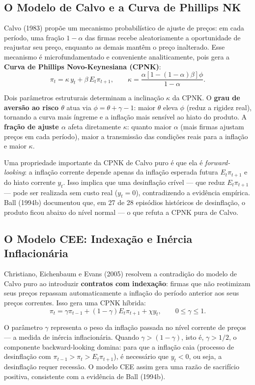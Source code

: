 \documentclass[12pt, a4paper]{article}
\begin{document}
\subsection{O Modelo de Calvo e a Curva de Phillips NK}

Calvo (1983) propõe um mecanismo probabilístico de ajuste de preços: em cada período, uma fração $1-\alpha$ das firmas recebe aleatoriamente a oportunidade de reajustar seu preço, enquanto as demais mantêm o preço inalterado. Esse mecanismo é microfundamentado e conveniente analiticamente, pois gera a \textbf{Curva de Phillips Novo-Keynesiana (CPNK)}:
\[
\pi_t = \kappa\, y_t + \beta\, E_t\pi_{t+1}, \qquad \kappa = \frac{\alpha[1-(1-\alpha)\beta]\phi}{1-\alpha}.
\]

Dois parâmetros estruturais determinam a inclinação $\kappa$ da CPNK. O \textbf{grau de aversão ao risco $\theta$} atua via $\phi = \theta+\gamma-1$: maior $\theta$ eleva $\phi$ (reduz a rigidez real), tornando a curva mais íngreme e a inflação mais sensível ao hiato do produto. A \textbf{fração de ajuste $\alpha$} afeta diretamente $\kappa$: quanto maior $\alpha$ (mais firmas ajustam preços em cada período), maior a transmissão das condições reais para a inflação e maior $\kappa$.

Uma propriedade importante da CPNK de Calvo puro é que ela é \emph{forward-looking}: a inflação corrente depende apenas da inflação esperada futura $E_t\pi_{t+1}$ e do hiato corrente $y_t$. Isso implica que uma desinflação crível — que reduz $E_t\pi_{t+1}$ — pode ser realizada sem custo real ($y_t = 0$), contradizendo a evidência empírica. Ball (1994b) documentou que, em 27 de 28 episódios históricos de desinflação, o produto ficou abaixo do nível normal — o que refuta a CPNK pura de Calvo.

\subsection{O Modelo CEE: Indexação e Inércia Inflacionária}

Christiano, Eichenbaum e Evans (2005) resolvem a contradição do modelo de Calvo puro ao introduzir \textbf{contratos com indexação}: firmas que não reotimizam seus preços repassam automaticamente a inflação do período anterior aos seus preços correntes. Isso gera uma CPNK híbrida:
\[
\pi_t = \gamma\pi_{t-1} + (1-\gamma)E_t\pi_{t+1} + \chi y_t, \qquad 0 \leq \gamma \leq 1.
\]

O parâmetro $\gamma$ representa o peso da inflação passada no nível corrente de preços — a medida de inércia inflacionária. Quando $\gamma > (1-\gamma)$, isto é, $\gamma > 1/2$, o componente backward-looking domina: para que a inflação caia (processo de desinflação com $\pi_{t-1} > \pi_t > E_t\pi_{t+1}$), é necessário que $y_t < 0$, ou seja, a desinflação requer recessão. O modelo CEE assim gera uma razão de sacrifício positiva, consistente com a evidência de Ball (1994b).
\end{document}
